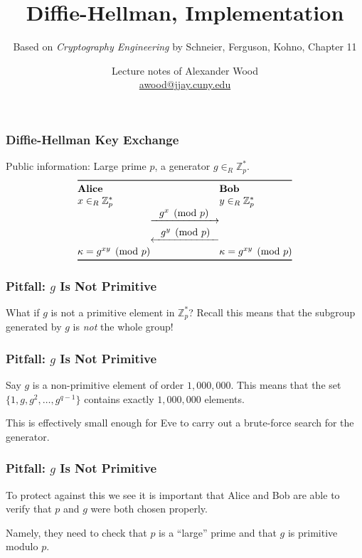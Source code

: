 \documentclass{beamer}
\title[Primes]{Diffie-Hellman, Implementation}
\subtitle{Based on  \emph{Cryptography Engineering} by Schneier, Ferguson, Kohno, Chapter 11}
\author{Lecture notes of Alexander Wood \\ \scriptsize \href{mailto:awood@jjay.cuny.edu}{awood@jjay.cuny.edu}}
\institute[JJay]{John Jay College of Criminal Justice}
\date{}
\newcommand{\<}{\langle}
\renewcommand{\>}{\rangle}
\newcommand{\Z}{\mathbb{Z}}
\begin{document}

\begin{frame}
  \titlepage
\end{frame}

\begin{frame}
\frametitle{Diffie-Hellman Key Exchange}
Public information: Large prime $p$, a generator $g\in_R\Z_p^*$.
\[
\begin{array}{@{}l@{}c@{}l@{}}
\toprule
\textbf{Alice} && \textbf{Bob} \\

x \in_R \Z_p^*&& y \in_R \Z_p^*\\

& \xrightarrow{\textstyle  \text{   }\text{ }  g^x\pmod p  \text{   }\text{ } } \\

& \xleftarrow {\textstyle \text{   }\text{ }  g^y \pmod p \text{ }  \text{ } } \\

\kappa = g^{xy} \pmod p && \kappa = g^{xy} \pmod p \\
\bottomrule
\end{array}
\]
\end{frame}


\begin{frame}
\frametitle{Pitfall: $g$ Is Not Primitive}

What if $g$ is not a primitive element in $\Z_p^*$? Recall this means that the subgroup generated by $g$ is \emph{not} the whole group! \newline
\end{frame}

\begin{frame}
\frametitle{Pitfall: $g$ Is Not Primitive}

Say $g$ is a non-primitive element of order $1,000,000$. This means that the set $\{1, g, g^2, \dots, g^{q-1}\}$ contains exactly $1,000,000$ elements. \newline

This is effectively small enough for Eve to carry out a brute-force search for the generator.
\end{frame}

\begin{frame}
\frametitle{Pitfall: $g$ Is Not Primitive}

To protect against this we see it is important that Alice and Bob are able to verify that $p$ and $g$ were both chosen properly.\newline

Namely, they need to check that $p$ is a ``large'' prime and that $g$ is primitive modulo $p$. 
\end{frame}
\end{document}
